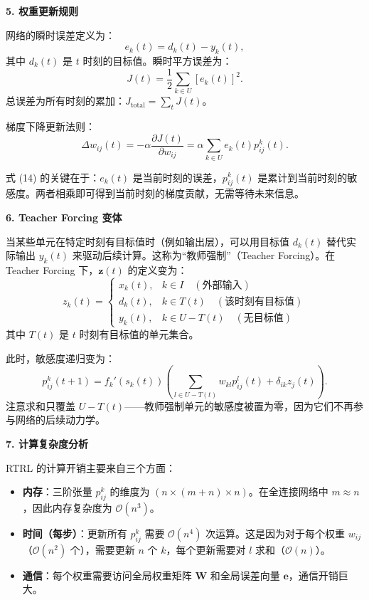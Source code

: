 \documentclass[journal,12pt,onecolumn]{IEEEtran}
\begin{document}
\medskip\noindent\textbf{5. 权重更新规则}

网络的瞬时误差定义为：
\[
e_k(t) = d_k(t) - y_k(t), \tag{12}
\]
其中 $d_k(t)$ 是 $t$ 时刻的目标值。瞬时平方误差为：
\[
J(t) = \frac{1}{2} \sum_{k \in U} [e_k(t)]^2. \tag{13}
\]
总误差为所有时刻的累加：$J_{\text{total}} = \sum_t J(t)$。

梯度下降更新法则：
\[
\Delta w_{ij}(t) = -\alpha \frac{\partial J(t)}{\partial w_{ij}} = \alpha \sum_{k \in U} e_k(t) p_{ij}^{k}(t). \tag{14}
\]

式 (14) 的关键在于：$e_k(t)$ 是当前时刻的误差，$p_{ij}^{k}(t)$ 是累计到当前时刻的敏感度。两者相乘即可得到当前时刻的梯度贡献，无需等待未来信息。

\medskip\noindent\textbf{6. Teacher Forcing 变体}

当某些单元在特定时刻有目标值时（例如输出层），可以用目标值 $d_k(t)$ 替代实际输出 $y_k(t)$ 来驱动后续计算。这称为“教师强制”（Teacher Forcing）。在 Teacher Forcing 下，$\mathbf{z}(t)$ 的定义变为：
\[
z_k(t) = \begin{cases}
x_k(t), & k \in I \quad (\text{外部输入}) \\
d_k(t), & k \in T(t) \quad (\text{该时刻有目标值}) \\
y_k(t), & k \in U - T(t) \quad (\text{无目标值})
\end{cases} \tag{15}
\]
其中 $T(t)$ 是 $t$ 时刻有目标值的单元集合。

此时，敏感度递归变为：
\[
p_{ij}^{k}(t+1) = f_k'(s_k(t)) \left( \sum_{l \in U - T(t)} w_{kl} p_{ij}^{l}(t) + \delta_{ik} z_j(t) \right). \tag{16}
\]
注意求和只覆盖 $U - T(t)$——教师强制单元的敏感度被置为零，因为它们不再参与网络的后续动力学。

\medskip\noindent\textbf{7. 计算复杂度分析}

RTRL 的计算开销主要来自三个方面：
\begin{itemize}
    \item \textbf{内存}：三阶张量 $p_{ij}^{k}$ 的维度为 $(n \times (m+n) \times n)$。在全连接网络中 $m \approx n$，因此内存复杂度为 $\mathcal{O}(n^3)$。
    \item \textbf{时间（每步）}：更新所有 $p_{ij}^{k}$ 需要 $\mathcal{O}(n^4)$ 次运算。这是因为对于每个权重 $w_{ij}$（$\mathcal{O}(n^2)$ 个），需要更新 $n$ 个 $k$，每个更新需要对 $l$ 求和（$\mathcal{O}(n)$）。
    \item \textbf{通信}：每个权重需要访问全局权重矩阵 $\mathbf{W}$ 和全局误差向量 $\mathbf{e}$，通信开销巨大。
\end{itemize}
\end{document}
